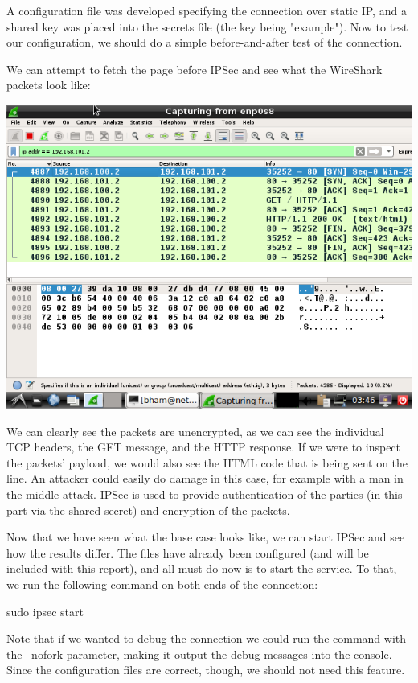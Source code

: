 \documentclass[10pt]{article}\usepackage[]{graphicx}\usepackage[]{color}
\begin{document}
A configuration file was developed specifying the connection over static IP, and a shared key was placed into the secrets file (the key being "example"). Now to test our configuration, we should do a simple before-and-after test of the connection.

We can attempt to fetch the page before IPSec and see what the WireShark packets look like:

\begin{center}
	\includegraphics[scale=0.7]{"ipsec_unsecure"}
\end{center}
%

We can clearly see the packets are unencrypted, as we can see the individual TCP headers, the GET message, and the HTTP response. If we were to inspect the packets' payload, we would also see the HTML code that is being sent on the line. An attacker could easily do damage in this case, for example with a man in the middle attack. IPSec is used to provide authentication of the parties (in this part via the shared secret) and encryption of the packets.

Now that we have seen what the base case looks like, we can start IPSec and see how the results differ. The files have already been configured (and will be included with this report), and all must do now is to start the service. To that, we run the following command on both ends of the connection:
\begin{center}
	sudo ipsec start
\end{center}
Note that if we wanted to debug the connection we could run the command with the --nofork parameter, making it output the debug messages into the console. Since the configuration files are correct, though, we should not need this feature.
\end{document}
